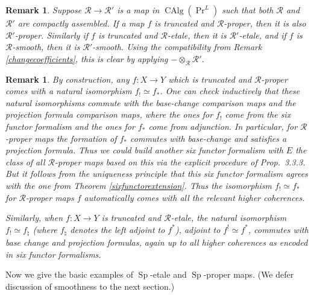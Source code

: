 \documentclass[12pt]{article}
\newtheorem{remark}[theorem]{Remark}
\newcommand{\on}{\operatorname}
\newcommand{\mc}{\mathcal}
\begin{document}
\begin{remark}
Suppose $\mathcal{R}\to\mathcal{R}'$ is a map in $\on{CAlg}(\on{Pr}^L)$ such that both $\mathcal{R}$ and $\mathcal{R}'$ are compactly assembled.  If a map $f$ is truncated and $\mathcal{R}$-proper, then it is also $\mathcal{R}'$-proper.  Similarly if $f$ is truncated and $\mathcal{R}$-etale, then it is $\mathcal{R}'$-etale, and if $f$ is $\mathcal{R}$-smooth, then it is $\mathcal{R}'$-smooth.  Using the compatibility from Remark \ref{changecoefficients}, this is clear by applying $-\otimes_\mc{R}\mc{R}'$.
\end{remark}


\begin{remark}
By construction, any $f:X\to Y$ which is truncated and $\mathcal{R}$-proper comes with a natural isomorphism $f_!\simeq f_\ast$.  One can check inductively that these natural isomorphisms commute with the base-change comparison maps and the projection formula comparison maps, where the ones for $f_!$ come from the six functor formalism and the ones for $f_\ast$ come from adjunction.  In particular, for $\mathcal{R}$-proper maps the formation of $f_\ast$ commutes with base-change and satisfies a projection formula.  Thus we could build another six functor formalism with $E$ the class of all $\mathcal{R}$-proper maps based on this via the explicit procedure of \cite{HeyerSixFunctors} Prop.\ 3.3.3.  But it follows from the uniqueness principle \cite{DauserUniqueness} that this six functor formalism agrees with the one from Theorem \ref{sixfunctorextension}.  Thus the isomorphism $f_!\simeq f_\ast$ for $\mathcal{R}$-proper maps $f$ automatically comes with all the relevant higher coherences.

Similarly, when $f:X\to Y$ is truncated and $\mathcal{R}$-etale, the natural isomorphism $f_!\simeq f_\natural$ (where $f_\natural$ denotes the left adjoint to $f^\ast$), adjoint to $f^!\simeq f^\ast$, commutes with base change and projection formulas, again up to all higher coherences as encoded in six functor formalisms.
\end{remark}


Now we give the basic examples of $\on{Sp}$-etale and $\on{Sp}$-proper maps.  (We defer discussion of smoothness to the next section.)
\end{document}
